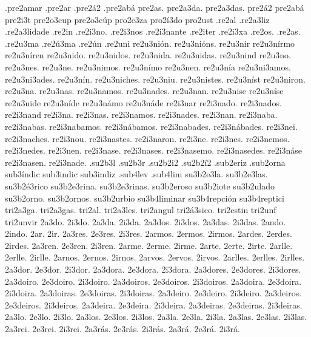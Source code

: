 {%
.pre2amar
.pre2ar
.pre2á2
.pre2abá
%
pre2as.
pre2a3da.
pre2a3das.
pre2á2
pre2abá
pre2i3t
pre2o3cup
pre2o3cúp
%
%
pro2e3za
pro2í3do
pro2ust
%
%
.re2al .re2a3liz .re2a3lidade .re2in .re2i3no. .re2i3nos .re2i3nante .re2iter
.re2i3xa .re2os. .re2as. .re2u3ma .re2ú3ma .re2ún .re2uni
%
re2u3nión. re2u3nións. re2u3nir re2u3nírmo re2u3níren
re2u3nido. re2u3nidos. re2u3nida. re2u3nidas. re2u3nind
re2u3no. re2u3nes. re2u3ne. re2u3nimos. re2u3nímo re2u3nen.
re2u3nía re2u3ni3amos. re2u3ni3ades.
re2u3nín. re2u3niches. re2u3niu. re2u3nistes. re2u3níst re2u3niron.
re2u3na. re2u3nas. re2u3namos. re2u3nades. re2u3nan.
re2u3nise re2u3níse
re2u3nide re2u3níde re2u3námo re2u3náde
%
re2i3nar re2i3nado. re2i3nados. re2i3nand
re2i3na. re2i3nas. re2i3namos. re2i3nades. re2i3nan.
re2i3naba. re2i3nabas. re2i3nabamos. re2i3nábamos. re2i3nabades. re2i3nábades.
re2i3nei. re2i3naches. re2i3nou. re2i3nastes. re2i3naron.
re2i3ne. re2i3nes. re2i3nemos. re2i3nedes. re2i3nen.
re2i3nase. re2i3nases. re2i3nasemo. re2i3nasedes. re2i3náse re2i3nasen.
re2i3nade.
%
.su2b3l .su2b3r
%
.su2b2i2
.su2b2í2
.sub2eriz
.sub2orna
%
sub3índic sub3indic sub3indiz
%
.sub4lev
.sub4lim
%
su3b2e3la.
su3b2e3las.
su3b2é3rico
su3b2e3rina.
su3b2e3rinas.
su3b2eroso
su3b2iote
su3b2ulado
su3b2orno.
su3b2ornos.
su3b2urbio
%
su3b4liminar
su3b4repción
su3b4reptici
%
%
tri2a3ga.
tri2a3gas.
tri2al.
tri2a3les.
tri2angul
tri2á3sico.
tri2estin
tri2unf
tri2unvir
%
%
2a3do. 2i3do.
2a3da. 2i3da.
2a3dos. 2i3dos.
2a3das. 2i3das.
2ando. 2indo.
2ar. 2ir.
%
2a3res. 2e3res. 2i3res.
2armos. 2ermos. 2irmos.
2ardes. 2erdes. 2irdes.
2a3ren. 2e3ren. 2i3ren.
%
2arme. 2erme. 2irme.
2arte. 2erte. 2irte.
2arlle. 2erlle. 2irlle.
2arnos. 2ernos. 2irnos.
2arvos. 2ervos. 2irvos.
2arlles. 2erlles. 2irlles.
%
2a3dor. 2e3dor. 2i3dor.
2a3dora. 2e3dora. 2i3dora.
2a3dores. 2e3dores. 2i3dores.
2a3doiro. 2e3doiro. 2i3doiro.
2a3doiros. 2e3doiros. 2i3doiros.
2a3doira. 2e3doira. 2i3doira.
2a3doiras. 2e3doiras. 2i3doiras.
2a3deiro. 2e3deiro. 2i3deiro.
2a3deiros. 2e3deiros. 2i3deiros.
2a3deira. 2e3deira. 2i3deira.
2a3deiras. 2e3deiras. 2i3deiras.
2a3lo. 2e3lo. 2i3lo.
2a3los. 2e3los. 2i3los.
2a3la. 2e3la. 2i3la.
2a3las. 2e3las. 2i3las.
2a3rei. 2e3rei. 2i3rei.
2a3rás. 2e3rás. 2i3rás.
2a3rá. 2e3rá. 2i3rá.
}
